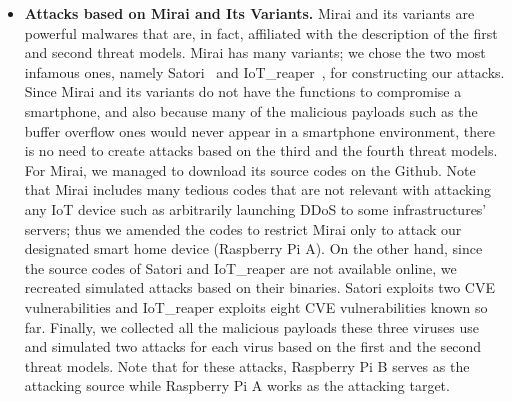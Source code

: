 \documentclass[letterpaper,12pt]{article}
\begin{document}
\begin{itemize}
\item \textbf{Attacks based on Mirai and Its Variants.}
Mirai and its variants are powerful malwares that are, in fact, affiliated with the description of the first and second threat models. Mirai has many variants; we chose the two most infamous ones, namely Satori~\cite{miraiwiki} and IoT\_reaper~\cite{iotreaper}, for constructing our attacks. Since Mirai and its variants do not have the functions to compromise a smartphone, and also because many of the malicious payloads such as the buffer overflow ones would never appear in a smartphone environment, there is no need to create attacks based on the third and the fourth threat models. For Mirai, we managed to download its source codes on the Github. Note that Mirai includes many tedious codes that are not relevant with attacking any IoT device such as arbitrarily launching DDoS to some infrastructures' servers; thus we amended the codes to restrict Mirai only to attack our designated smart home device (Raspberry Pi A). On the other hand, since the source codes of Satori and IoT\_reaper are not available online, we recreated simulated attacks based on their binaries. Satori exploits two CVE vulnerabilities and IoT\_reaper exploits eight CVE vulnerabilities known so far. Finally, we collected all the malicious payloads these three viruses use and simulated two attacks for each virus based on the first and the second threat models. Note that for these attacks, Raspberry Pi B serves as the attacking source while Raspberry Pi A works as the attacking target.

\end{itemize}
\end{document}

